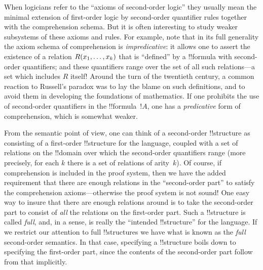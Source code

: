 \documentclass[../../../include/open-logic-section]{subfiles}
\begin{document}
When logicians refer to the ``axioms of second-order logic'' they
usually mean the minimal extension of first-order logic by
second-order quantifier rules together with the comprehension
schema. But it is often interesting to study weaker subsystems of
these axioms and rules. For example, note that in its full generality
the axiom schema of comprehension is \emph{impredicative}: it allows
one to assert the existence of a relation $\mathord{R}(x_1, \dots, x_k)$
that is ``defined'' by a !!{formula} with second-order quantifiers; and
these quantifiers range over the set of all such relations---a set
which includes $R$ itself!{} Around the turn of the twentieth century, a
common reaction to Russell's paradox was to lay the blame on such
definitions, and to avoid them in developing the foundations of
mathematics. If one prohibits the use of second-order quantifiers in
the !!{formula}~$!A$, one has a {\em predicative} form of
comprehension, which is somewhat weaker.

From the semantic point of view, one can think of a second-order
!!{structure} as consisting of a first-order !!{structure} for the
language, coupled with a set of relations on the !!{domain} over which
the second-order quantifiers range (more precisely, for each $k$ there
is a set of relations of arity~$k$). Of course, if comprehension is
included in the proof system, then we have the added requirement that
there are enough relations in the ``second-order part'' to satisfy the
comprehension axioms---otherwise the proof system is not sound!{} One
easy way to insure that there are enough relations around is to take
the second-order part to consist of \emph{all} the relations on the
first-order part. Such a !!{structure} is called \emph{full}, and, in a
sense, is really the ``intended !!{structure}'' for the language. If
we restrict our attention to full !!{structure}s we have what is known
as the \emph{full} second-order semantics. In that case, specifying a
!!{structure} boils down to specifying the first-order part, since the
contents of the second-order part follow from that implicitly.
\end{document}
